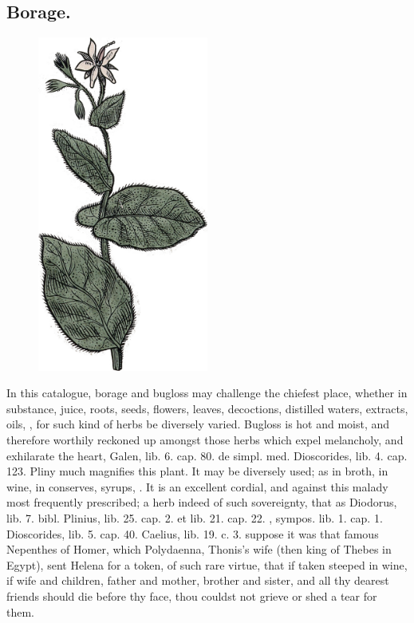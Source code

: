 {\subsection{Borage.}
\begin{figure}
  \begingroup
  \includegraphics[keepaspectratio,width=0.5\textwidth]{figures/buglossa-small.jpg}
  \label{fig:buglosa}
\end{figure}
In this catalogue, borage and bugloss may challenge the
chiefest place, whether in substance, juice, roots, seeds, flowers,
leaves, decoctions, distilled waters, extracts, oils, \etc{}, for such
kind of herbs be diversely varied. Bugloss is hot and moist, and
therefore worthily reckoned up amongst those herbs which expel
melancholy, and  exhilarate the heart, Galen, lib. 6. cap. 80. de
simpl. med. Dioscorides, lib. 4. cap. 123. Pliny much magnifies this
plant. It may be diversely used; as in broth, in wine, in
conserves, syrups, \etc{}. It is an excellent cordial, and against this
malady most frequently prescribed; a herb indeed of such sovereignty,
that as Diodorus, lib. 7. bibl. Plinius, lib. 25. cap. 2. et lib. 21.
cap. 22. \Plutarch, sympos. lib. 1. cap. 1. Dioscorides, lib. 5. cap.
40. Caelius, lib. 19. c. 3. suppose it was that famous Nepenthes of
Homer, which Polydaenna, Thonis's wife (then king of Thebes in
Egypt), sent Helena for a token, of such rare virtue, that if taken
steeped in wine, if wife and children, father and mother, brother and
sister, and all thy dearest friends should die before thy face, thou
couldst not grieve or shed a tear for them.

}
